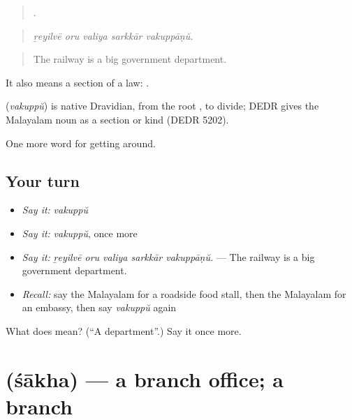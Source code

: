 \begin{quote}
    .
\end{quote}

\begin{quote}
\emph{ṟeyilvē oru valiya sarkkār vakuppāṇŭ.}
\end{quote}

\begin{quote}
The railway is a big government department.
\end{quote}

It also means a section of a law:   .

\begin{cousinweb}
\textbf{} (\emph{vakuppŭ}) is native Dravidian, from the root , to divide; DEDR gives the Malayalam noun as a section or kind (DEDR 5202).
\end{cousinweb}

\begin{grammarlens}[title={What you've built}]
One more word for getting around.
\end{grammarlens}

\subsection*{Your turn}
\begin{itemize}
\raggedright
  \item \emph{Say it:} \emph{vakuppŭ}
  \item \emph{Say it:} \emph{vakuppŭ}, once more
  \item \emph{Say it:} \emph{ṟeyilvē oru valiya sarkkār vakuppāṇŭ.} — The railway is a big government department.
  \item \emph{Recall:} say the Malayalam for a roadside food stall, then the Malayalam for an embassy, then say \emph{vakuppŭ} again
\end{itemize}

\begin{tcolorbox}[breakable,colback=teal!4,colframe=teal!35!black,title={Before you move on}]
What does  mean? (\textquotedblleft{}A department\textquotedblright{}.) Say it once more.
\end{tcolorbox}
\section[\texorpdfstring{\ml{ശാഖ} (śākha)}{ശാഖ (śākha)}]{ (śākha) — a branch office; a branch}


